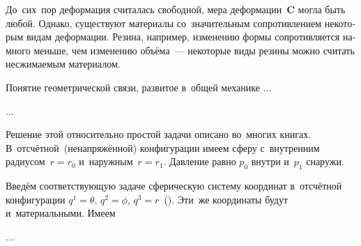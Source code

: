 \begin{otherlanguage}{russian}
\label{para:internalconstraints}

До~сих~пор деформация считалась свободной, мера деформации~$\bm{C}$ могла быть любой. Однако, существуют материалы со~значительным сопротивлением некоторым видам деформации. Резина, например, изменению формы сопротивляется намного меньше, чем изменению объёма~--- некоторые виды резины можно считать несжимаемым материалом.

Понятие геометрической связи, развитое в~общей механике ...

...





\label{para:hollowsphereunderpressure}

Решение этой относительно простой задачи описано во~многих книгах. В~отсчётной~(ненапряжённой) конфигурации имеем сферу с~внутренним радиусом~${r \!=\! r_0}$ и~наружным~${r \!=\! r_1}$. Давление равно $p_0$ внутри и~$p_1$ снаружи.

Введём соответствующую задаче сферическую систему координат в~отсчётной конфигурации ${q^1 = \theta}$, ${q^2 = \phi}$, ${q^3 = r}$~(). Эти~же координаты будут и~материальными. Имеем

...



\end{otherlanguage}

\newpage



\label{para:stressesAsLagrangeMultipliers}

